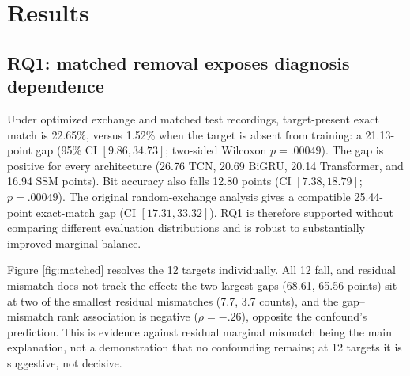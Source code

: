 \documentclass[conference,a4paper]{IEEEtran}
\begin{document}
\section{Results}
\subsection{RQ1: matched removal exposes diagnosis dependence}
Under optimized exchange and matched test recordings, target-present exact match
is 22.65\%, versus 1.52\% when the target is absent from training: a 21.13-point
gap (95\% CI $[9.86,34.73]$; two-sided Wilcoxon $p=.00049$). The gap is positive
for every architecture (26.76 TCN, 20.69 BiGRU, 20.14 Transformer, and 16.94 SSM
points). Bit accuracy also falls 12.80 points (CI $[7.38,18.79]$; $p=.00049$).
The original random-exchange analysis gives a compatible 25.44-point exact-match
gap (CI $[17.31,33.32]$). RQ1 is therefore supported without comparing different
evaluation distributions and is robust to substantially improved marginal balance.

Figure \ref{fig:matched} resolves the 12 targets individually. All 12 fall, and
residual mismatch does not track the effect: the two largest gaps (68.61,
65.56 points) sit at two of the smallest residual mismatches (7.7, 3.7 counts),
and the gap--mismatch rank association is negative ($\rho=-.26$), opposite the
confound's prediction. This is evidence against residual marginal mismatch
being the main explanation, not a demonstration that no confounding remains; at
12 targets it is suggestive, not decisive.
\end{document}
